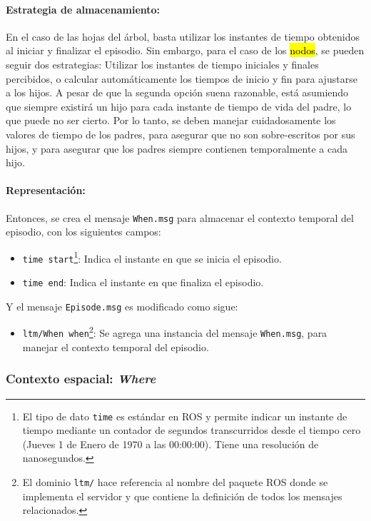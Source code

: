 \paragraph{Estrategia de almacenamiento:}
En el caso de las hojas del árbol, basta utilizar los instantes de tiempo obtenidos al iniciar y finalizar el episodio. Sin embargo, para el caso de los \hl{nodos}, se pueden seguir dos estrategias: Utilizar los instantes de tiempo iniciales y finales percibidos, o calcular automáticamente los tiempos de inicio y fin para ajustarse a los hijos. A pesar de que la segunda opción suena razonable, está asumiendo que siempre existirá un hijo para cada instante de tiempo de vida del padre, lo que puede no ser cierto. Por lo tanto, se deben manejar cuidadosamente los valores de tiempo de los padres, para asegurar que no son sobre-escritos por sus hijos, y para asegurar que los padres siempre contienen temporalmente a cada hijo.

\paragraph{Representación:}
Entonces, se crea el mensaje \texttt{When.msg} para almacenar el contexto temporal del episodio, con los siguientes campos:
\begin{itemize}
	\item \texttt{time start}\footnote{El tipo de dato \texttt{time} es estándar en ROS y permite indicar un instante de tiempo mediante un contador de segundos transcurridos desde el tiempo cero (Jueves 1 de Enero de 1970 a las 00:00:00). Tiene una resolución de nanosegundos.}: Indica el instante en que se inicia el episodio.
	\item \texttt{time end}: Indica el instante en que finaliza el episodio.
\end{itemize}

Y el mensaje \texttt{Episode.msg} es modificado como sigue:
\begin{itemize}
	\item \texttt{ltm/When when}\footnote{El dominio \texttt{ltm/} hace referencia al nombre del paquete ROS donde se implementa el servidor y que contiene la definición de todos los mensajes relacionados.}: Se agrega una instancia del mensaje \texttt{When.msg}, para manejar el contexto temporal del episodio.
\end{itemize}

 
\subsubsection{Contexto espacial: \textit{Where}}

